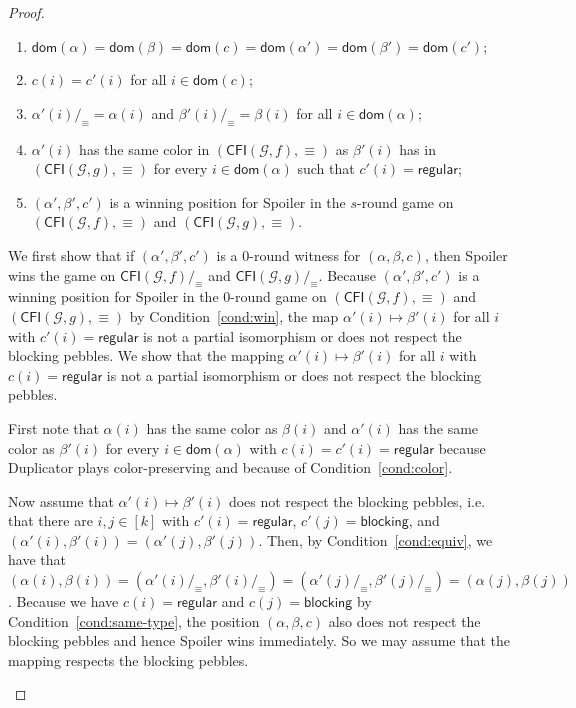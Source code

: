 \documentclass[10pt,a4paper]{article}
\newcommand{\regular}{\mathsf{regular}}
\newcommand{\blocking}{\mathsf{blocking}}
\newcommand{\comp}{\equiv}
\newcommand{\CFIsym}{\mathsf{CFI}}
\newcommand{\CFI}[1]{\CFIsym(#1)}
\newcommand{\compCFI}[2]{\CFI{#1}/_{#2}}
\newcommand{\precompCFI}[2]{{(\CFI{#1},#2)}}
\newcommand{\graphG}{\mathcal{G}}
\newcommand{\dom}{\mathsf{dom}}
\begin{document}
\begin{proof}
\begin{enumerate}
\begin{enumerate}
\item $\dom(\alpha) = \dom(\beta) =\dom(c) = \dom(\alpha') = \dom(\beta') = \dom(c')$;
                \item \label{cond:same-type} $c(i) = c'(i)$ for all $i\in\dom(c)$;
                \item \label{cond:equiv} $\alpha'(i)/_\comp = \alpha(i)$ and $\beta'(i)/_\comp = \beta(i)$ for all $i\in\dom(\alpha)$; 
                \item \label{cond:color} $\alpha'(i)$ has the same color in $\precompCFI{\graphG,f}{\comp}$ as $\beta'(i)$ has in $\precompCFI{\graphG,g}{\comp}$ for every $i \in  \dom(\alpha)$ such that $c'(i) = \regular$;
                \item \label{cond:win} $(\alpha', \beta', c')$ is a winning position for Spoiler in the $s$-round game on $\precompCFI{\graphG,f}{\comp}$ and $\precompCFI{\graphG,g}{\comp}$.
        \end{enumerate}
        We first show that if $(\alpha', \beta', c')$ is a $0$\nobreakdash-round witness for $(\alpha,\beta,c)$,
        then Spoiler wins the game on $\compCFI{\graphG,f}{\comp}$ and $\compCFI{\graphG,g}{\comp}$.
        Because $(\alpha', \beta', c')$ is a winning position for Spoiler in the $0$\nobreakdash-round game on $\precompCFI{\graphG,f}{\comp}$ and $\precompCFI{\graphG,g}{\comp}$
        by Condition~\ref{cond:win},
        the map $\alpha'(i) \mapsto \beta'(i)$ for all $i$ with $c'(i) =\regular$
        is not a partial isomorphism
        or does not respect the blocking pebbles.
        We show that the mapping
        $\alpha'(i) \mapsto \beta'(i)$ for all $i$ with $c(i) =\regular$
        is not a partial isomorphism
        or does not respect the blocking pebbles.
        
        First note that $\alpha(i)$ has the same color
        as $\beta(i)$
        and $\alpha'(i)$ has the same color as $\beta'(i)$
        for every $i \in \dom(\alpha)$ with $c(i)=c'(i) = \regular$
        because Duplicator plays color-preserving and because of Condition~\ref{cond:color}. 
        
        Now assume that $\alpha'(i) \mapsto \beta'(i)$ does not respect the blocking pebbles, i.e. that there are $i,j\in[k]$ with $c'(i) = \regular$, $c'(j) =\blocking$, and
        $(\alpha'(i),\beta'(i)) = (\alpha'(j), \beta'(j))$.
        Then, by Condition~\ref{cond:equiv},
        we have that $(\alpha(i),\beta(i)) = (\alpha'(i)/_\comp, \beta'(i)/_\comp)
        = (\alpha'(j)/_\comp, \beta'(j)/_\comp) = (\alpha(j),\beta(j))$.
        Because we have $c(i) = \regular$ and $c(j) = \blocking$
        by Condition~\ref{cond:same-type},
        the position $(\alpha,\beta,c)$ also does not respect the blocking pebbles
        and hence Spoiler wins immediately.
        So we may assume that the mapping respects the blocking pebbles.
        

\end{enumerate}
\end{proof}
\end{document}

